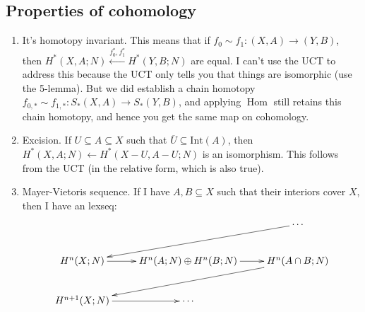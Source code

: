 \documentclass{amsart}
\theoremstyle{theorem}
\theoremstyle{definition}
\DeclareMathOperator{\Hom}{Hom}
\begin{document}
\subsection{Properties of cohomology}
\begin{enumerate}
\item It's homotopy invariant. This means that if $f_0\sim f_1:(X,A)\to (Y,B)$, then $ H^\ast(X,A;N)\xleftarrow{f_0^\ast,f_1^\ast} H^\ast(Y,B;N)$ are equal. I can't use the UCT to address this because the UCT only tells you that things are isomorphic (use the 5-lemma). But we did establish a chain homotopy $f_{0,\ast}\sim f_{1,\ast}:S_\ast(X,A)\to S_\ast(Y,B)$, and applying $\Hom$ still retains this chain homotopy, and hence you get the same map on cohomology.
\item Excision. If $U\subseteq A\subseteq X$ such that $\overline{U}\subseteq\mathrm{Int}(A)$, then $ H^\ast(X,A;N)\leftarrow H^\ast(X-U,A-U;N)$ is an isomorphism. This follows from the UCT (in the relative form, which is also true).
\item Mayer-Vietoris sequence. If I have $A,B\subseteq X$ such that their interiors cover $X$, then I have an lexseq:
\begin{equation*}
\xymatrix{ & & \cdots\ar[dll]\\
 H^n(X;N)\ar[r] & H^n(A;N)\oplus H^n(B;N)\ar[r] & H^n(A\cap B;N)\ar[dll]\\
 H^{n+1}(X;N)\ar[r] & \cdots & }
\end{equation*}
\end{enumerate}
\end{document}
